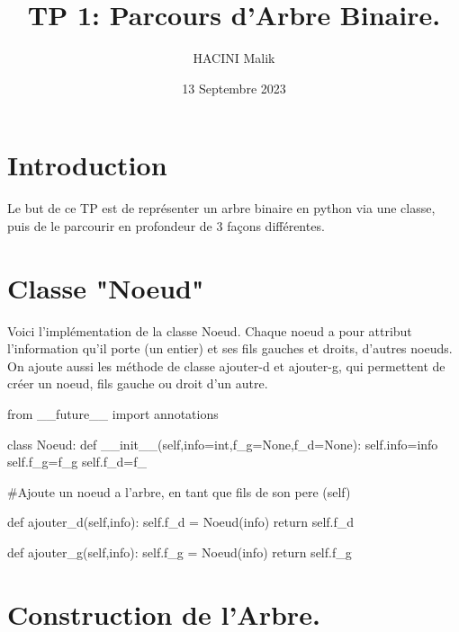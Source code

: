 \documentclass{article}
\title{TP 1: Parcours d'Arbre Binaire.}
\author{HACINI Malik}
\date{13 Septembre 2023}
\begin{document}
\maketitle
\tableofcontents{}

\section{Introduction}

Le but de ce TP est de représenter un arbre binaire en python via une classe,
puis de le parcourir en profondeur de 3 façons différentes.



\section{Classe "Noeud"}
Voici l'implémentation de la classe Noeud.
Chaque noeud a pour attribut l'information qu'il porte (un entier) 
et ses fils gauches et droits, d'autres noeuds.
On ajoute aussi les méthode de classe ajouter-d et ajouter-g, qui
permettent de créer un noeud, fils gauche ou droit d'un autre.

\begin{python}
    from __future__ import annotations

class Noeud:
    def __init__(self,info=int,f_g=None,f_d=None):
        self.info=info
        self.f_g=f_g
        self.f_d=f_
        
    #Ajoute un noeud a l'arbre, en tant que fils de son pere (self)

    def ajouter_d(self,info):
        self.f_d = Noeud(info)
        return self.f_d
    
    def ajouter_g(self,info):
        self.f_g = Noeud(info)
        return self.f_g

\end{python}

\section{Construction de l'Arbre.}
\end{document}

